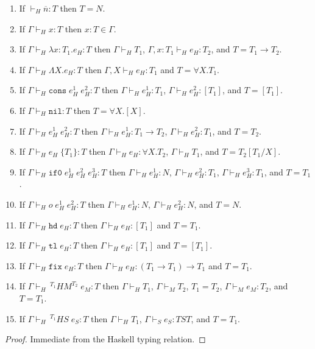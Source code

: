 \begin{hi}
\label{hi}
\mbox{}
\begin{enumerate}
\item If $\vdash_{H}\overline{n}:T$ then $T=N$.
\item If $\Gamma\vdash_{H}x:T$ then $x:T\in\Gamma$.
\item If $\Gamma\vdash_{H}\lambda x:T_{1}.e_{H}:T$ then $\Gamma\vdash_{H}T_{1}$, $\Gamma,x:T_{1}\vdash_{H}e_{H}:T_{2}$, and $T=T_{1}\rightarrow T_{2}$.
\item If $\Gamma\vdash_{H}\Lambda X.e_{H}:T$ then $\Gamma,X\vdash_{H}e_{H}:T_{1}$ and $T=\forall X.T_{1}$.
\item If $\Gamma\vdash_{H}\mathtt{cons}\;e_{H}^{1}\;e_{H}^{2}:T$ then $\Gamma\vdash_{H}e_{H}^{1}:T_{1}$, $\Gamma\vdash_{H}e_{H}^{2}:[T_{1}]$, and $T=[T_{1}]$.
\item If $\Gamma\vdash_{H}\mathtt{nil}:T$ then $T=\forall X.[X]$.
\item If $\Gamma\vdash_{H}e_{H}^{1}\;e_{H}^{2}:T$ then $\Gamma\vdash_{H}e_{H}^{1}:T_{1}\rightarrow T_{2}$, $\Gamma\vdash_{H}e_{H}^{2}:T_{1}$, and $T=T_{2}$.
\item If $\Gamma\vdash_{H}e_{H}\;\lbrace T_{1}\rbrace:T$ then $\Gamma\vdash_{H}e_{H}:\forall X.T_{2}$, $\Gamma\vdash_{H}T_{1}$, and $T=T_{2}[T_{1}/X]$.
\item If $\Gamma\vdash_{H}\mathtt{if0}\;e_{H}^{1}\;e_{H}^{2}\;e_{H}^{3}:T$ then $\Gamma\vdash_{H}e_{H}^{1}:N$, $\Gamma\vdash_{H}e_{H}^{2}:T_{1}$, $\Gamma\vdash_{H}e_{H}^{3}:T_{1}$, and $T=T_{1}$.
\item If $\Gamma\vdash_{H}o\;e_{H}^{1}\;e_{H}^{2}:T$ then $\Gamma\vdash_{H}e_{H}^{1}:N$, $\Gamma\vdash_{H}e_{H}^{2}:N$, and $T=N$.
\item If $\Gamma\vdash_{H}\mathtt{hd}\;e_{H}:T$ then $\Gamma\vdash_{H}e_{H}:[T_{1}]$ and $T=T_{1}$.
\item If $\Gamma\vdash_{H}\mathtt{tl}\;e_{H}:T$ then $\Gamma\vdash_{H}e_{H}:[T_{1}]$ and $T=[T_{1}]$.
\item If $\Gamma\vdash_{H}\mathtt{fix}\;e_{H}:T$ then $\Gamma\vdash_{H}e_{H}:(T_{1}\rightarrow T_{1})\rightarrow T_{1}$ and $T=T_{1}$.
\item If $\Gamma\vdash_{H}\,^{T_{1}}HM^{T_{2}}\;e_{M}:T$ then $\Gamma\vdash_{H}T_{1}$, $\Gamma\vdash_{M}T_{2}$, $T_{1}=T_{2}$, $\Gamma\vdash_{M}e_{M}:T_{2}$, and $T=T_{1}$.
\item If $\Gamma\vdash_{H}\,^{T_{1}}HS\;e_{S}:T$ then $\Gamma\vdash_{H}T_{1}$, $\Gamma\vdash_{S}e_{S}:TST$, and $T=T_{1}$.
\end{enumerate}
\begin{proof}
Immediate from the Haskell typing relation.
\end{proof}
\end{hi}
